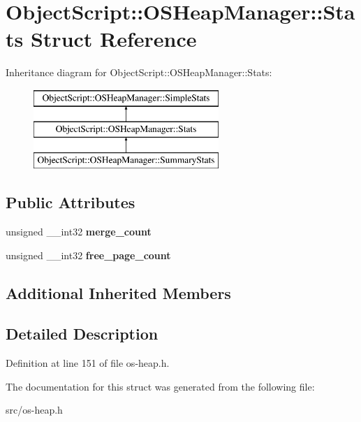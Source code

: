\hypertarget{struct_object_script_1_1_o_s_heap_manager_1_1_stats}{}\section{Object\+Script\+:\+:O\+S\+Heap\+Manager\+:\+:Stats Struct Reference}
\label{struct_object_script_1_1_o_s_heap_manager_1_1_stats}
Inheritance diagram for Object\+Script\+:\+:O\+S\+Heap\+Manager\+:\+:Stats\+:\begin{figure}[H]
\begin{center}
\leavevmode
\includegraphics[height=3.000000cm]{struct_object_script_1_1_o_s_heap_manager_1_1_stats}
\end{center}
\end{figure}
\subsection*{Public Attributes}
\begin{DoxyCompactItemize}
\item 
unsigned \+\_\+\+\_\+int32 {\bfseries merge\+\_\+count}\hypertarget{struct_object_script_1_1_o_s_heap_manager_1_1_stats_a64d8327e179c670b44326a1ce3ceb8e2}{}\label{struct_object_script_1_1_o_s_heap_manager_1_1_stats_a64d8327e179c670b44326a1ce3ceb8e2}

\item 
unsigned \+\_\+\+\_\+int32 {\bfseries free\+\_\+page\+\_\+count}\hypertarget{struct_object_script_1_1_o_s_heap_manager_1_1_stats_a44638f374b0473e6eb51f511120e10bf}{}\label{struct_object_script_1_1_o_s_heap_manager_1_1_stats_a44638f374b0473e6eb51f511120e10bf}

\end{DoxyCompactItemize}
\subsection*{Additional Inherited Members}


\subsection{Detailed Description}


Definition at line 151 of file os-\/heap.\+h.



The documentation for this struct was generated from the following file\+:\begin{DoxyCompactItemize}
\item 
src/os-\/heap.\+h\end{DoxyCompactItemize}
